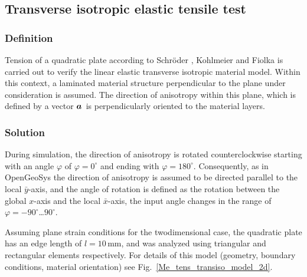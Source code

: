 \subsection{Transverse isotropic elastic tensile test}
\label{subsec:Me7}

\subsubsection{Definition}
\label{subsubsec:Me7_def}

Tension of a quadratic plate according to Schr\"oder \cite{Schroeder:1996}, Kohlmeier \cite{Kohlmeier:2006} and Fiolka \cite{Fiolka:2007} is carried out to verify the linear elastic transverse isotropic material model. Within this context, a laminated material structure perpendicular to the plane under consideration is assumed. The direction of anisotropy within this plane, which is defined by a vector $\mbox{${\mbox{\boldmath${a}$\unboldmath}}_{\:\!}$}$ is perpendicularly oriented to the material layers.

\subsubsection{Solution}
\label{subsubsec:Me7_sol}

During simulation, the direction of anisotropy is rotated counterclockwise starting with an angle $\varphi$ of $\varphi=0^{\circ}$ and ending with $\varphi=180^{\circ}$. Consequently, as in OpenGeoSys the direction of anisotropy is assumed to be directed parallel to the local $\bar{y}$-axis, and the angle of rotation is defined as the rotation between the global $x$-axis and the local $\bar{x}$-axis, the input angle changes in the range of $\varphi=-90^{\circ}$\dots$90^{\circ}$.

Assuming plane strain conditions for the twodimensional case, the quadratic plate has an edge length of $l=10\,$mm, and was analyzed using triangular and rectangular elements respectively. For details of this model (geometry, boundary conditions, material orientation) see Fig.~\ref{Me_tens_transiso_model_2d}.

